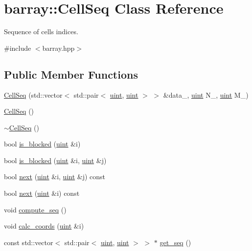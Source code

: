 \hypertarget{classbarray_1_1_cell_seq}{}\section{barray\+:\+:Cell\+Seq Class Reference}
\label{classbarray_1_1_cell_seq}


Sequence of cells indices.  




{\ttfamily \#include $<$barray.\+hpp$>$}

\subsection*{Public Member Functions}
\begin{DoxyCompactItemize}
\item 
\hyperlink{classbarray_1_1_cell_seq_a3f1fcc18a3e9a9572d403791368f0db7}{Cell\+Seq} (std\+::vector$<$ std\+::pair$<$ \hyperlink{namespacebarray_af9756a31953db233f80a9cfe1ef31c32}{uint}, \hyperlink{namespacebarray_af9756a31953db233f80a9cfe1ef31c32}{uint} $>$ $>$ \&data\+\_\+, \hyperlink{namespacebarray_af9756a31953db233f80a9cfe1ef31c32}{uint} N\+\_\+, \hyperlink{namespacebarray_af9756a31953db233f80a9cfe1ef31c32}{uint} M\+\_\+)
\item 
\hyperlink{classbarray_1_1_cell_seq_a985bcd1fd5c813965ab496f660e3243b}{Cell\+Seq} ()
\item 
\hyperlink{classbarray_1_1_cell_seq_a0841b94890087dd4199c7c561082e8dc}{$\sim$\+Cell\+Seq} ()
\item 
bool \hyperlink{classbarray_1_1_cell_seq_a994900efdcf73e7619f728d584e92c5a}{is\+\_\+blocked} (\hyperlink{namespacebarray_af9756a31953db233f80a9cfe1ef31c32}{uint} \&i)
\item 
bool \hyperlink{classbarray_1_1_cell_seq_a5a5730ec094c9a4251753302a9504149}{is\+\_\+blocked} (\hyperlink{namespacebarray_af9756a31953db233f80a9cfe1ef31c32}{uint} \&i, \hyperlink{namespacebarray_af9756a31953db233f80a9cfe1ef31c32}{uint} \&j)
\item 
bool \hyperlink{classbarray_1_1_cell_seq_a05687b1000bcce13c0f81c0203363ce7}{next} (\hyperlink{namespacebarray_af9756a31953db233f80a9cfe1ef31c32}{uint} \&i, \hyperlink{namespacebarray_af9756a31953db233f80a9cfe1ef31c32}{uint} \&j) const
\item 
bool \hyperlink{classbarray_1_1_cell_seq_abae3355ed2481f8e7b82ad2175633c7b}{next} (\hyperlink{namespacebarray_af9756a31953db233f80a9cfe1ef31c32}{uint} \&i) const
\item 
void \hyperlink{classbarray_1_1_cell_seq_a6588fe1ad4e37f7a845386eca46c13c2}{compute\+\_\+seq} ()
\item 
void \hyperlink{classbarray_1_1_cell_seq_a6054321ba5a2e0ba3c0953ef08828994}{calc\+\_\+coords} (\hyperlink{namespacebarray_af9756a31953db233f80a9cfe1ef31c32}{uint} \&i)
\item 
const std\+::vector$<$ std\+::pair$<$ \hyperlink{namespacebarray_af9756a31953db233f80a9cfe1ef31c32}{uint}, \hyperlink{namespacebarray_af9756a31953db233f80a9cfe1ef31c32}{uint} $>$ $>$ $\ast$ \hyperlink{classbarray_1_1_cell_seq_a12235ff9c4a0183ed477679b61c4a19a}{get\+\_\+seq} ()
\end{DoxyCompactItemize}
